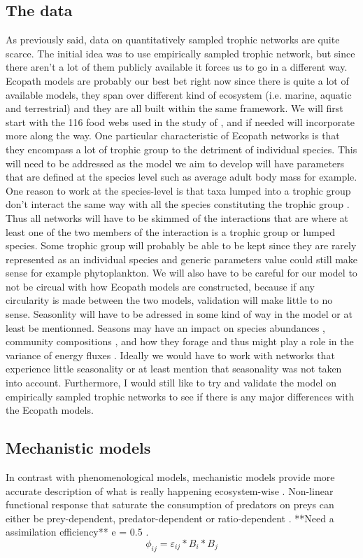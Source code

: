 \documentclass[english,12pt]{article}
\begin{document}
\subsection{The data}
As previously said, data on quantitatively sampled trophic networks are quite scarce. The initial idea was to use empirically sampled trophic network, but since there aren't a lot of them publicly available it forces us to go in a different way. Ecopath models are probably our best bet right now since there is quite a lot of available models, they span over different kind of ecosystem (i.e. marine, aquatic and terrestrial) and they are all built within the same framework. We will first start with the 116 food webs used in the study of \citet{Jacquet2016NoCom}, and if needed will incorporate more along the way. One particular characteristic of Ecopath networks is that they encompass a lot of trophic group to the detriment of individual species. This will need to be addressed as the model we aim to develop will have parameters that are defined at the species level such as average adult body mass for example. One reason to work at the species-level is that taxa lumped into a trophic group don't interact the same way with all the species constituting the trophic group \citep{Ings2009RevEco}. Thus all networks will have to be skimmed of the interactions that are where at least one of the two members of the interaction is a trophic group or lumped species. Some trophic group will probably be able to be kept since they are rarely represented as an individual species and generic parameters value could still make sense for example phytoplankton. We will also have to be careful for our model to not be circual with how Ecopath models are constructed, because if any circularity is made between the two models, validation will make little to no sense. Seasonlity will have to be adressed in some kind of way in the model or at least be mentionned. Seasons may have an impact on species abundances \citep{Ings2009RevEco}, community compositions \citep{Mellard2019SeaPat}, and how they forage and thus might play a role in the variance of energy fluxes \citep{McMeans2019ConTro}. Ideally we would have to work with networks that experience little seasonality or at least mention that seasonality was not taken into account. Furthermore, I would still like to try and validate the model on empirically sampled trophic networks to see if there is any major differences with the Ecopath models. 


\subsection{Mechanistic models} 
In contrast with phenomenological models, mechanistic models provide more accurate description of what is really happening ecosystem-wise \cite{Delmas2017SimBio}. 
Non-linear functional response that saturate the consumption of predators on preys can either be prey-dependent, predator-dependent or ratio-dependent \cite{Williams2006HomYod}.
**Need a assimilation efficiency**
e = 0.5 \citep{Pawar2015RolBod}.
\begin{equation*}
  \phi_{ij} = \varepsilon_{ij}*B_{i}*B_{j}
\end{equation*}
\end{document}
